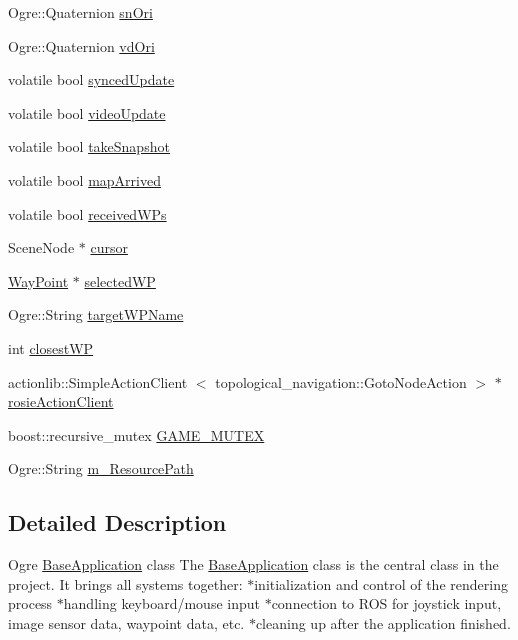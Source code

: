 \begin{DoxyCompactItemize}
\item 
\-Ogre\-::\-Quaternion \hyperlink{classBaseApplication_a60cc66a44a0900ec65d19b3903168ca5}{sn\-Ori}
\item 
\-Ogre\-::\-Quaternion \hyperlink{classBaseApplication_ae855031951285ecc5c368fca44af62d5}{vd\-Ori}
\item 
volatile bool \hyperlink{classBaseApplication_a921d190dc1981ae57a49972c3b7ffbc9}{synced\-Update}
\item 
volatile bool \hyperlink{classBaseApplication_abbf6dd8d322875c5dc66d4eaee58049d}{video\-Update}
\item 
volatile bool \hyperlink{classBaseApplication_af7b2240ae783b353704370debc7092ba}{take\-Snapshot}
\item 
volatile bool \hyperlink{classBaseApplication_a5129489840c94ca7bcc092ebe5bea689}{map\-Arrived}
\item 
volatile bool \hyperlink{classBaseApplication_a37fa2d6256de90b4babeee56bcd143d4}{received\-W\-Ps}
\item 
\-Scene\-Node $\ast$ \hyperlink{classBaseApplication_af66eb984ef0ef903c272b79a852cce93}{cursor}
\item 
\hyperlink{classWayPoint}{\-Way\-Point} $\ast$ \hyperlink{classBaseApplication_a1f77aab5b657f16b4aa44200cf12d662}{selected\-W\-P}
\item 
\-Ogre\-::\-String \hyperlink{classBaseApplication_a3aff6a781058410dc648c0d07fd7afb8}{target\-W\-P\-Name}
\item 
int \hyperlink{classBaseApplication_a5dcf0fddc75e2b46d35fd8b9ed592dc9}{closest\-W\-P}
\item 
actionlib\-::\-Simple\-Action\-Client\*
$<$ topological\-\_\-navigation\-::\-Goto\-Node\-Action $>$ $\ast$ \hyperlink{classBaseApplication_a48fdcb84193361574ad803e3e9529b9f}{rosie\-Action\-Client}
\item 
boost\-::recursive\-\_\-mutex \hyperlink{classBaseApplication_a2b3c5be6607bdf48ac909bafe48d3a89}{\-G\-A\-M\-E\-\_\-\-M\-U\-T\-E\-X}
\item 
\-Ogre\-::\-String \hyperlink{classBaseApplication_ad96aabaabb2aeaf7bbb88e995b82eb02}{m\-\_\-\-Resource\-Path}
\end{DoxyCompactItemize}


\subsection{\-Detailed \-Description}
\-Ogre \hyperlink{classBaseApplication}{\-Base\-Application} class \-The \hyperlink{classBaseApplication}{\-Base\-Application} class is the central class in the project. \-It brings all systems together\-: $\ast$initialization and control of the rendering process $\ast$handling keyboard/mouse input $\ast$connection to \-R\-O\-S for joystick input, image sensor data, waypoint data, etc. $\ast$cleaning up after the application finished. 

